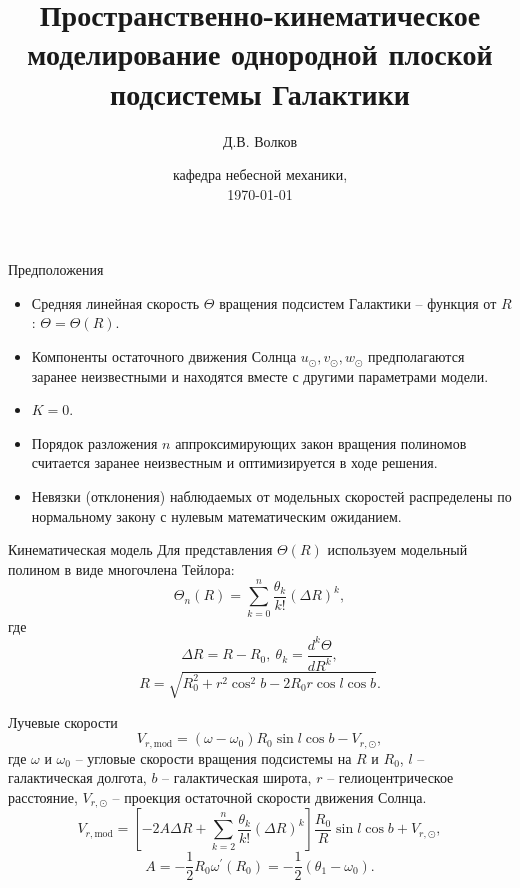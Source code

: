 \documentclass{beamer}
\begin{document}
\title{Пространственно-кинематическое моделирование однородной плоской подсистемы Галактики}  
\author{Д.В. Волков}
\date{кафедра небесной механики, \\ \today} 
\frame{\titlepage} 

\begin{frame}{Предположения}
	\begin{itemize}
		\item Средняя линейная скорость $\Theta$ вращения подсистем Галактики -- функция от $R$: $\Theta = \Theta (R)$.
		\item Компоненты остаточного движения Солнца $u_{\odot}, v_{\odot}, w_{\odot}$ предполагаются заранее неизвестными и находятся вместе с другими параметрами модели.
                \item $K = 0$.
                \item Порядок разложения $n$ аппроксимирующих закон вращения полиномов считается заранее неизвестным и оптимизируется в ходе решения.
                \item Невязки (отклонения) наблюдаемых от модельных скоростей распределены по нормальному закону с нулевым математическим ожиданием. 
	\end{itemize}
\end{frame}

\begin{frame}{Кинематическая модель}
Для представления $\Theta(R)$ используем модельный полином в виде многочлена Тейлора:
	\begin{equation}
		\Theta_n(R) = \sum^n_{k = 0} \frac{\theta_k}{k!} \left( \Delta R \right)^k,
	\end{equation}
где
\begin{equation}
        \Delta R = R - R_0, ~\theta_k = \frac{d^k\Theta}{dR^k},
\end{equation}
\begin{equation}
	R = \sqrt{R_0^2 + r^2 \cos^2{b} - 2R_0 r \cos{l} \cos{b}}.
\end{equation}
\end{frame}

\begin{frame}{Лучевые скорости}
\begin{equation}
        V_{r, \mathrm{mod}} = (\omega - \omega_0) R_0 \sin{l} \cos{b} - V_{r, \odot},
\end{equation}
где $\omega$ и $\omega_0$ -- угловые скорости вращения подсистемы на $R$ и $R_0$, $l$ -- галактическая долгота, $b$ -- галактическая широта, $r$ -- гелиоцентрическое расстояние, $V_{r, \odot}$ -- проекция остаточной скорости движения Солнца.
	\begin{equation}
		V_{r, \mathrm{mod}} = \left[ -2A\Delta R + \sum^n_{k = 2} \frac{\theta_k}{k!} \left( \Delta R \right)^k \right] \frac{R_0}{R} \sin{l} \cos{b} + V_{r, \odot},
	\end{equation}
	\begin{equation}
		A = - \frac{1}{2} R_0 \omega^{'}(R_0) = - \frac{1}{2} (\theta_1 - \omega_0).
	\end{equation}
\end{frame}
\end{document}
